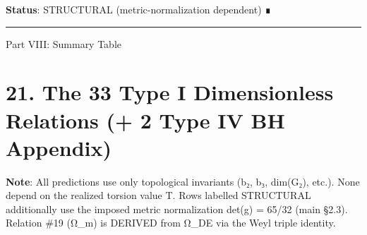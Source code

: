 \documentclass[11pt,a4paper]{article}
\begin{document}
\textbf{Status}: STRUCTURAL (metric-normalization dependent) ∎

\begin{center}\rule{\linewidth}{0.5pt}\end{center}

Part VIII: Summary Table

\section{21. The 33 Type I Dimensionless Relations (+ 2 Type IV BH Appendix)}\label{the-33-type-i-dimensionless-relations-2-type-iv-bh-appendix}

\textbf{Note}: All predictions use only topological invariants (b₂, b₃, dim(G₂), etc.). None depend on the realized torsion value T. Rows labelled STRUCTURAL additionally use the imposed metric normalization det(g) = 65/32 (main §2.3). Relation \#19 (Ω\_\allowbreak{}m) is DERIVED from Ω\_\allowbreak{}DE via the Weyl triple identity.
\end{document}
